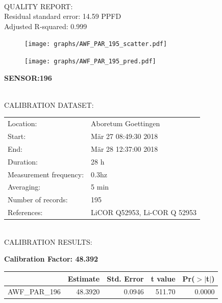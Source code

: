 \documentclass[oneside]{report}
\begin{document}
\hrulefill\\
QUALITY REPORT:\\
Residual standard error: 14.59 PPFD\\
Adjusted R-squared: 0.999



\begin{figure}[H]
  \centering
  \texttt{[image: graphs/AWF\_PAR\_195\_scatter.pdf]}
\end{figure}




\begin{figure}[H]
  \centering
  \texttt{[image: graphs/AWF\_PAR\_195\_pred.pdf]}
\end{figure}

\pagebreak


\begin{center}
\large{\textbf{SENSOR:196}}\\
\end{center}

\hrulefill\\
CALIBRATION DATASET:\\
\begin{table}[h!]
  \centering
  \label{tab:table1}
  \begin{tabular}{ll}
    Location: & Aboretum Goettingen\\ 
    
    
    Start:  & Mär 27 08:49:30 2018 \\
    End:   & Mär 28 12:37:00 2018\\ 
    Duration: & 28 h\\
    Measurement frequency: & 0.3hz\\
    Averaging:  &5 min\\
    Number of records: & 195 \\
    References: & LiCOR Q52953, Li-COR Q 52953 \\
  \end{tabular}
\end{table}

\hrulefill\\
CALIBRATION RESULTS:\\


\begin{center}
\textbf{\large{Calibration Factor: 48.392}}\\
\end{center}
\begin{table}[ht]
\centering
\begin{tabular}{rrrrr}
  \hline
 & Estimate & Std. Error & t value & Pr($>$$|$t$|$) \\ 
  \hline
AWF\_PAR\_196 & 48.3920 & 0.0946 & 511.70 & 0.0000 \\ 
   \hline
\end{tabular}
\end{table}
\end{document}
